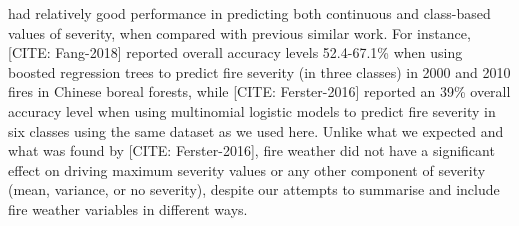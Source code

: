 \documentclass[
  numafflabel,
  authoryear,
  preprint]{elsarticle}
\begin{document}
had relatively good performance in predicting both continuous and
class-based values of severity, when compared with previous similar
work. For instance, {[}CITE: Fang-2018{]} reported overall accuracy
levels 52.4-67.1\% when using boosted regression trees to predict fire
severity (in three classes) in 2000 and 2010 fires in Chinese boreal
forests, while {[}CITE: Ferster-2016{]} reported an 39\% overall
accuracy level when using multinomial logistic models to predict fire
severity in six classes using the same dataset as we used here. Unlike
what we expected and what was found by {[}CITE: Ferster-2016{]}, fire
weather did not have a significant effect on driving maximum severity
values or any other component of severity (mean, variance, or no
severity), despite our attempts to summarise and include fire weather
variables in different ways.
\end{document}
